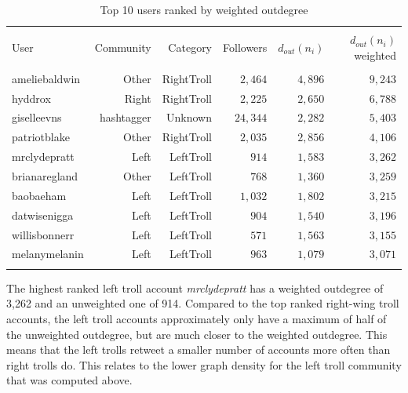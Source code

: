 \documentclass[12pt, titlepage=true, toc=bib]{scrartcl}
\begin{document}
\begin{table}[!ht] \centering 
\begin{tabular*}{.95\linewidth}{@{\extracolsep{\fill}} lrrrrr} 
\\[-1.8ex]\hline 
\hline \\[-1.8ex] 
User & Community & Category & Followers & \( d_{out}(n_{i}) \) & \( d_{out}(n_{i}) \) weighted \\ 
\hline \\[-1.8ex] 
ameliebaldwin & Other & RightTroll & $2,464$ & $4,896$ & $9,243$ \\ 
hyddrox & Right & RightTroll & $2,225$ & $2,650$ & $6,788$ \\ 
giselleevns & hashtagger & Unknown & $24,344$ & $2,282$ & $5,403$ \\ 
patriotblake & Other & RightTroll & $2,035$ & $2,856$ & $4,106$ \\ 
mrclydepratt & Left & LeftTroll & $914$ & $1,583$ & $3,262$ \\ 
brianaregland & Other & LeftTroll & $768$ & $1,360$ & $3,259$ \\ 
baobaeham & Left & LeftTroll & $1,032$ & $1,802$ & $3,215$ \\ 
datwisenigga & Left & LeftTroll & $904$ & $1,540$ & $3,196$ \\ 
willisbonnerr & Left & LeftTroll & $571$ & $1,563$ & $3,155$ \\ 
melanymelanin & Left & LeftTroll & $963$ & $1,079$ & $3,071$ \\ 
\hline \\[-1.8ex] 
\end{tabular*} 
  \caption[Outdegree weighted]{Top 10 users ranked by weighted outdegree} 
  \label{tab:wout} 
\end{table} 

The highest ranked left troll account \textit{mrclydepratt} has a weighted outdegree of 3,262 and an unweighted one of 914. Compared to the top ranked right-wing troll accounts, the left troll accounts approximately only have a maximum of half of the unweighted outdegree, but are much closer to the weighted outdegree. This means that the left trolls retweet a smaller number of accounts more often than right trolls do. This relates to the lower graph density for the left troll community that was computed above.
\end{document}
